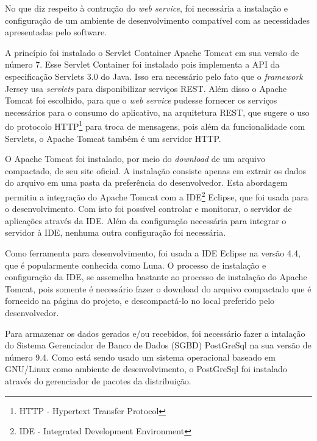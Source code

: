 	
	\par No que diz respeito à contrução do \textit{web service}, foi necessária a
instalação e configuração de um ambiente de desenvolvimento compatível com as
necessidades apresentadas pelo software.

	\par A princípio foi instalado o Servlet Container Apache Tomcat em sua versão
de número {7}. Esse Servlet Container foi instalado pois implementa a API da
especificação Servlets {3.0} do Java. Isso era necessário pelo fato que o
\textit{framework} Jersey usa \textit{servlets} para disponibilizar serviços
REST. Além disso o Apache Tomcat foi escolhido, para que o \textit{web service}
pudesse fornecer os serviços necessários para o consumo do aplicativo, na
arquitetura REST, que sugere o uso do protocolo HTTP\footnote{HTTP - Hypertext
Transfer Protocol} para troca de mensagens, pois além da funcionalidade com
Servlets, o Apache Tomcat também é um servidor HTTP.
	
	\par O Apache Tomcat foi instalado, por meio do \textit{download} de um
arquivo compactado, de seu site oficial. A instalação consiste apenas
em extrair os dados do arquivo em uma pasta da preferência do desenvolvedor.
Esta abordagem permitiu a integração do Apache Tomcat com a
IDE\footnote{IDE - Integrated Development Environment}
Eclipse, que foi usada para o desenvolvimento. Com isto foi possível controlar
e monitorar, o servidor de aplicações através da IDE. Além da configuração
necessária para integrar o servidor à IDE, nenhuma outra configuração foi
necessária.

	\par Como ferramenta para desenvolvimento, foi usada a IDE Eclipse na versão
{4.4}, que é popularmente conhecida como Luna. O processo de instalação e
configuração da IDE, se assemelha bastante ao processo de instalação do Apache
Tomcat, pois somente é necessário fazer o download do arquivo compactado que é
fornecido na página do projeto, e descompactá-lo no local preferido pelo
desenvolvedor.

	\par Para armazenar os dados gerados e/ou recebidos, foi necessário fazer a
intalação do Sistema Gerenciador de Banco de Dados (SGBD) PostGreSql na sua
versão de número {9.4}. Como está sendo usado um sistema operacional baseado em
GNU/Linux como ambiente de desenvolvimento, o PostGreSql foi instalado através
do gerenciador de pacotes da distribuição.
 
